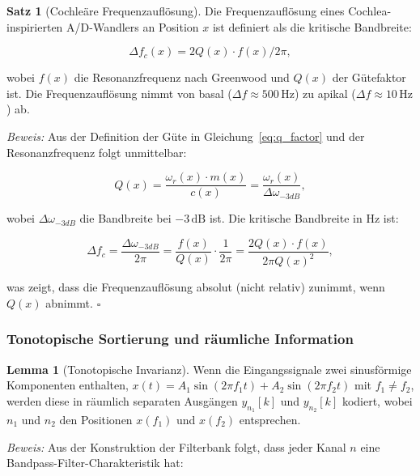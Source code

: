 ﻿\documentclass[12pt, a4paper]{article}
\theoremstyle{definition}
\newtheorem{satz}{Satz}[section]
\newtheorem{lemma}{Lemma}[section]
\theoremstyle{remark}
\begin{document}
\begin{satz}[Cochleäre Frequenzauflösung]
\label{satz:cochlear_resolution}
Die Frequenzauflösung eines Cochlea-inspirierten A/D-Wandlers an Position $x$ 
ist definiert als die kritische Bandbreite:

\begin{equation}
\label{eq:critical_bandwidth}
\Delta f_c(x) = 2 Q(x) \cdot f(x) / 2\pi,
\end{equation}

wobei $f(x)$ die Resonanzfrequenz nach Greenwood und $Q(x)$ der Gütefaktor ist. 
Die Frequenzauflösung nimmt von basal ($\Delta f \approx 500\,\mathrm{Hz}$) zu 
apikal ($\Delta f \approx 10\,\mathrm{Hz}$) ab.
\end{satz}

\emph{Beweis:} Aus der Definition der Güte in Gleichung~\eqref{eq:q_factor} und 
der Resonanzfrequenz folgt unmittelbar:

\begin{equation}
Q(x) = \frac{\omega_r(x) \cdot m(x)}{c(x)} = \frac{\omega_r(x)}{\Delta\omega_{-3dB}},
\end{equation}

wobei $\Delta\omega_{-3dB}$ die Bandbreite bei $-3\,\mathrm{dB}$ ist. Die kritische 
Bandbreite in Hz ist:

\begin{equation}
\Delta f_c = \frac{\Delta\omega_{-3dB}}{2\pi} = \frac{f(x)}{Q(x)} \cdot \frac{1}{2\pi} 
= \frac{2 Q(x) \cdot f(x)}{2\pi Q(x)^2},
\end{equation}

was zeigt, dass die Frequenzauflösung absolut (nicht relativ) zunimmt, wenn $Q(x)$ 
abnimmt. $\square$

\subsubsection{Tonotopische Sortierung und räumliche Information}

\begin{lemma}[Tonotopische Invarianz]
\label{lem:tonotopic_invariance}
Wenn die Eingangssignale zwei sinusförmige Komponenten enthalten, 
$x(t) = A_1 \sin(2\pi f_1 t) + A_2 \sin(2\pi f_2 t)$ mit $f_1 \neq f_2$, 
werden diese in räumlich separaten Ausgängen $y_{n_1}[k]$ und $y_{n_2}[k]$ 
kodiert, wobei $n_1$ und $n_2$ den Positionen $x(f_1)$ und $x(f_2)$ entsprechen.
\end{lemma}

\emph{Beweis:} Aus der Konstruktion der Filterbank folgt, dass jeder Kanal $n$ 
eine Bandpass-Filter-Charakteristik hat:
\end{document}
